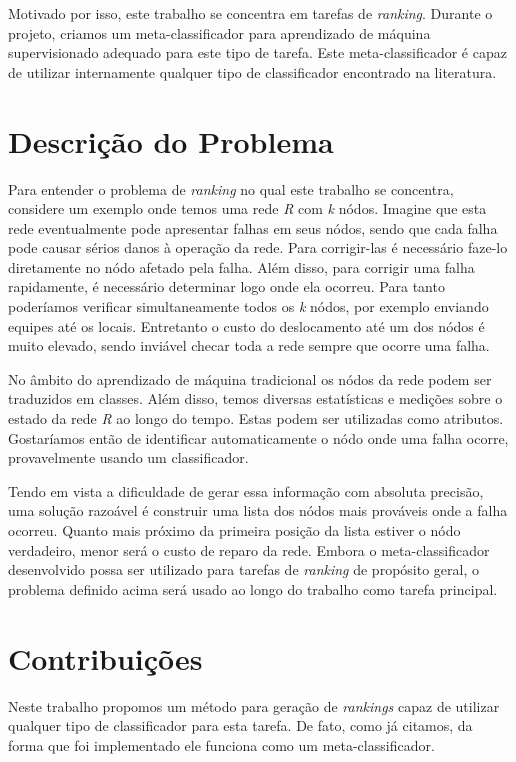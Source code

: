 Motivado por isso, este trabalho se concentra em tarefas de \textit{ranking}.
Durante o projeto, criamos um meta-classificador para aprendizado de máquina supervisionado adequado para este tipo de tarefa.
Este meta-classificador é capaz de utilizar internamente qualquer tipo de classificador encontrado na literatura.

\section{Descrição do Problema}

Para entender o problema de \textit{ranking} no qual este trabalho se concentra, considere um exemplo onde temos uma rede \textit{R} com \textit{k} nódos.
Imagine que esta rede eventualmente pode apresentar falhas em seus nódos, sendo que cada falha pode causar sérios danos à operação da rede.
Para corrigir-las é necessário faze-lo diretamente no nódo afetado pela falha.
Além disso, para corrigir uma falha rapidamente, é necessário determinar logo onde ela ocorreu.
Para tanto poderíamos verificar simultaneamente todos os \textit{k} nódos, por exemplo enviando equipes até os locais.
Entretanto o custo do deslocamento até um dos nódos é muito elevado, sendo inviável checar toda a rede sempre que ocorre uma falha.

No âmbito do aprendizado de máquina tradicional os nódos da rede podem ser traduzidos em classes.
Além disso, temos diversas estatísticas e medições sobre o estado da rede \textit{R} ao longo do tempo.
Estas podem ser utilizadas como atributos.
Gostaríamos então de identificar automaticamente o nódo onde uma falha ocorre, provavelmente usando um classificador.

Tendo em vista a dificuldade de gerar essa informação com absoluta precisão, uma solução razoável é construir uma lista dos nódos mais prováveis onde a falha ocorreu.
Quanto mais próximo da primeira posição da lista estiver o nódo verdadeiro, menor será o custo de reparo da rede.
Embora o meta-classificador desenvolvido possa ser utilizado para tarefas de \textit{ranking} de propósito geral, o problema definido acima será usado ao longo do trabalho como tarefa principal.

\section{Contribuições}

Neste trabalho propomos um método para geração de \textit{rankings} capaz de utilizar qualquer tipo de classificador para esta tarefa.
De fato, como já citamos, da forma que foi implementado ele funciona como um meta-classificador.

